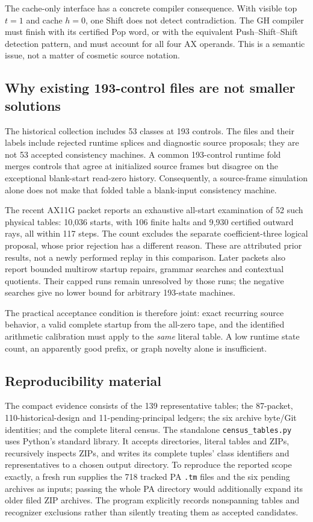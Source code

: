 The cache-only interface has a concrete compiler consequence. With visible
top $t=1$ and cache $h=0$, one Shift does not detect contradiction. The GH
compiler must finish with its certified Pop word, or with the equivalent
Push--Shift--Shift detection pattern, and must account for all four AX
operands. This is a semantic issue, not a matter of cosmetic source notation.

\subsection{Why existing 193-control files are not smaller solutions}

The historical collection includes 53 classes at 193 controls. The files
and their labels include rejected runtime splices and diagnostic source
proposals; they are not 53 accepted consistency machines. A common
193-control runtime fold merges controls that agree at initialized source
frames but disagree on the exceptional blank-start read-zero history.
Consequently, a source-frame simulation alone does not make that folded
table a blank-input consistency machine.

The recent AX11G packet reports an exhaustive all-start examination of
52 such physical tables: 10,036 starts, with 106 finite halts and 9,930
certified outward rays, all within 117 steps. The count excludes the
separate coefficient-three logical proposal, whose prior rejection has a
different reason. These are attributed prior results, not a newly performed
replay in this comparison. Later packets also report bounded multirow
startup repairs, grammar searches and contextual quotients. Their capped
runs remain unresolved by those runs; the negative searches give no lower
bound for arbitrary 193-state machines.

The practical acceptance condition is therefore joint: exact recurring
source behavior, a valid complete startup from the all-zero tape, and the
identified arithmetic calibration must apply to the \emph{same} literal
table. A low runtime state count, an apparently good prefix, or graph
novelty alone is insufficient.

\subsection{Reproducibility material}

The compact evidence consists of the 139 representative tables; the
87-packet, 110-historical-design and 11-pending-principal ledgers;
the six archive byte/Git identities; and the complete literal census.
The standalone \texttt{census\_tables.py} uses Python's standard library.
It accepts directories, literal tables and ZIPs, recursively inspects ZIPs,
and writes its complete tuples' class identifiers and representatives to a
chosen output directory. To reproduce the reported scope exactly, a fresh
run supplies the 718 tracked PA \texttt{.tm} files and the six pending
archives as inputs; passing the whole PA directory would additionally
expand its older filed ZIP archives. The program explicitly records nonspanning
tables and recognizer exclusions rather than silently treating them as
accepted candidates.
